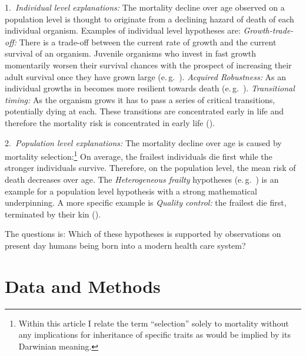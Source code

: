 \documentclass[12pt, parskip=half]{scrartcl}
\begin{document}
1.~\emph{Individual level explanations:} The mortality decline over age observed on a population level is thought to originate from a declining hazard of death of each individual organism. Examples of individual level hypotheses are:
  \emph{Growth-trade-off:} There is a trade-off between the current rate of growth and the current survival of an organism. Juvenile organisms who invest in fast growth momentarily worsen their survival chances with the prospect of increasing their adult survival once they have grown large (e.\,g.~\cite{Chu2008}).
  \emph{Acquired Robustness:} As an individual growths in becomes more resilient towards death (e.\,g.~\cite{Munch2006}).
  \emph{Transitional timing:} As the organism grows it has to pass a series of critical transitions, potentially dying at each. These transitions are concentrated early in life and therefore the mortality risk is concentrated in early life (\cite{Levitis2011}).

2.~\emph{Population level explanations:} The mortality decline over age is caused by mortality selection:\footnote{Within this article I relate the term \enquote{selection} solely to mortality without any implications for inheritance of specific traits as would be implied by its Darwinian meaning.} On average, the frailest individuals die first while the stronger individuals survive. Therefore, on the population level, the mean risk of death decreases over age. The \emph{Heterogeneous frailty} hypotheses (e.\,g.~\cite{Vaupel1985}) is an example for a population level hypothesis with a strong mathematical underpinning. A more specific example is \emph{Quality control:} the frailest die first, terminated by their kin (\cite{Hamilton1966}).


The questions is: Which of these hypotheses is supported by observations on present day humans being born into a modern health care system?

\section{Data and Methods} %
\label{sec:data_and_methods}
\end{document}

